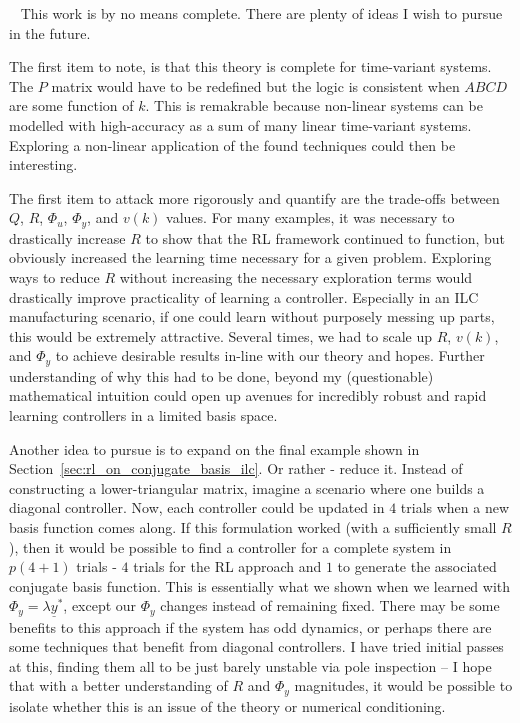 ~\label{sec:future_work}
This work is by no means complete. There are plenty of ideas I wish to pursue in the future.

The first item to note, is that this theory is complete for time-variant systems. The $P$ matrix would have to be redefined but the logic is consistent when $ABCD$ are some function of $k$. This is remakrable because non-linear systems can be modelled with high-accuracy as a sum of many linear time-variant systems. Exploring a non-linear application of the found techniques could then be interesting.

The first item to attack more rigorously and quantify are the trade-offs between $Q$, $R$, $\Phi_u$, $\Phi_y$, and $v(k)$ values. For many examples, it was necessary to drastically increase $R$ to show that the RL framework continued to function, but obviously increased the learning time necessary for a given problem. Exploring ways to reduce $R$ without increasing the necessary exploration terms would drastically improve practicality of learning a controller. Especially in an ILC manufacturing scenario, if one could learn without purposely messing up parts, this would be extremely attractive. Several times, we had to scale up $R$, $v(k)$, and $\Phi_y$ to achieve desirable results in-line with our theory and hopes. Further understanding of why this had to be done, beyond my (questionable) mathematical intuition could open up avenues for incredibly robust and rapid learning controllers in a limited basis space.

Another idea to pursue is to expand on the final example shown in Section~\ref{sec:rl_on_conjugate_basis_ilc}. 
Or rather - reduce it. Instead of constructing a lower-triangular matrix, imagine a scenario where one builds a diagonal controller. Now, each controller could be updated in $4$ trials when a new basis function comes along. If this formulation worked (with a sufficiently small $R$), then it would be possible to find a controller for a complete system in $p(4 + 1)$ trials - $4$ trials for the RL approach and $1$ to generate the associated conjugate basis function. This is essentially what we shown when we learned with $\Phi_y = \lambda \underline{y}^\ast$, except our $\Phi_y$ changes instead of remaining fixed. There may be some benefits to this approach if the system has odd dynamics, or perhaps there are some techniques that benefit from diagonal controllers. I have tried initial passes at this, finding them all to be just barely unstable via pole inspection -- I hope that with a better understanding of $R$ and $\Phi_y$ magnitudes, it would be possible to isolate whether this is an issue of the theory or numerical conditioning.

